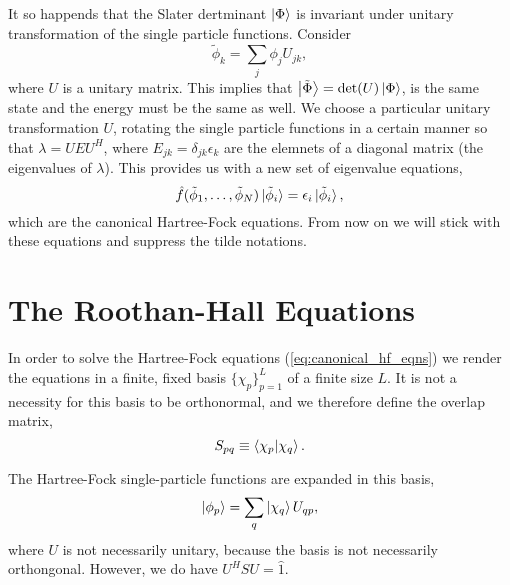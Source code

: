 It so happends that the Slater dertminant $\ket{\Phi}$ is invariant under unitary
transformation of the single particle functions. Consider
\begin{equation}
    \tilde{\phi}_k = \sum_j \phi_j U_{jk},
\end{equation}
where $U$ is a unitary matrix. This implies that $\ket{\tilde{\Phi}} = \det(U)\ket{\Phi}$,
is the same state and the energy must be the same as well. We choose a particular
unitary transformation $U$, rotating the single particle functions in a certain 
manner so that $\lambda = UEU^H$, where $E_{jk} = \delta_{jk}\epsilon_k$ are the 
elemnets of a diagonal matrix (the eigenvalues of $\lambda$). This provides us with 
a new set of eigenvalue equations,
\begin{equation}
    \label{eq:canonical_hf_eqns}
    \hat{f}(\tilde{\phi}_1, \dots, \tilde{\phi}_N)\ket*{\tilde{\phi}_i}
        = \epsilon_i \ket*{\tilde{\phi}_i},
\end{equation}
which are the canonical Hartree-Fock equations. From now on we will stick with these 
equations and suppress the tilde notations.

\section{The Roothan-Hall Equations}
\label{sec:roothan_hall_eqns}

In order to solve the Hartree-Fock equations (\autoref{eq:canonical_hf_eqns}) we 
render the equations in a finite, fixed basis $\{\chi_p \}_{p=1}^L$ of a finite 
size $L$. It is not a necessity for this basis to be orthonormal, and we therefore 
define the overlap matrix,
\begin{equation}
    S_{pq} \equiv \braket{\chi_p}{\chi_q}.
\end{equation}

The Hartree-Fock single-particle functions are expanded in this basis,
\begin{equation}
    \label{eq:roothan_hall_exp}
    \ket{\phi_p} = \sum_q \ket{\chi_q} U_{qp},
\end{equation}
where $U$ is not necessarily unitary, because the basis is not necessarily 
orthongonal. However, we do have $U^HSU = \hat{1}$.

